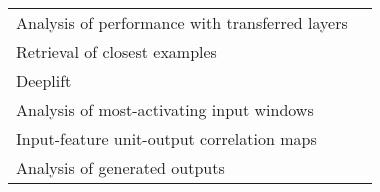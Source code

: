\begin{tabular}{ll}
Analysis of performance with transferred layers        &                                                                                                                                                                            \cite{Hajinoroozi2017} \\
Retrieval of closest examples                          &                                                                                                                                                                                  \cite{Deiss2018} \\
Deeplift                                               &                                                                                                                                                                                \cite{Lawhern2018} \\
Analysis of most-activating input windows              &                                                                                                                                                                              \cite{Hartmann2018b} \\
Input-feature unit-output correlation maps             &                                                                                                                                                                          \cite{Schirrmeister2017} \\
Analysis of generated outputs                          &                                                                                                                                                                               \cite{Hartmann2018} \\
\bottomrule
\end{tabular}
